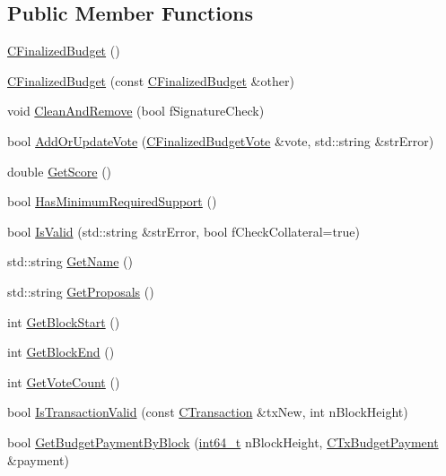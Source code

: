 \subsection*{Public Member Functions}
\begin{DoxyCompactItemize}
\item 
\hyperlink{class_c_finalized_budget_a70a5842e7be58407c5ff5daade0e6e45}{C\+Finalized\+Budget} ()
\item 
\hyperlink{class_c_finalized_budget_a701687a3f6f5dadaa8cf20b188306005}{C\+Finalized\+Budget} (const \hyperlink{class_c_finalized_budget}{C\+Finalized\+Budget} \&other)
\item 
void \hyperlink{class_c_finalized_budget_a11cbbc4f8f84e5ffb2b7257168da98be}{Clean\+And\+Remove} (bool f\+Signature\+Check)
\item 
bool \hyperlink{class_c_finalized_budget_a63fadb286f5d0f9f735bc33deba56b02}{Add\+Or\+Update\+Vote} (\hyperlink{class_c_finalized_budget_vote}{C\+Finalized\+Budget\+Vote} \&vote, std\+::string \&str\+Error)
\item 
double \hyperlink{class_c_finalized_budget_aadcaaf7b39cfe0400253db00c5fe0b03}{Get\+Score} ()
\item 
bool \hyperlink{class_c_finalized_budget_a96b19202f64cb941239a500e7895c048}{Has\+Minimum\+Required\+Support} ()
\item 
bool \hyperlink{class_c_finalized_budget_ae91a3b63f88979a2cf5252b91b9f339d}{Is\+Valid} (std\+::string \&str\+Error, bool f\+Check\+Collateral=true)
\item 
std\+::string \hyperlink{class_c_finalized_budget_adc46e6b0931fd6335d0788311886a1ba}{Get\+Name} ()
\item 
std\+::string \hyperlink{class_c_finalized_budget_a49cb2b919e0de352628d6157cfa1e1c8}{Get\+Proposals} ()
\item 
int \hyperlink{class_c_finalized_budget_adf320ff0b74a982c0aadc5d8a5e168db}{Get\+Block\+Start} ()
\item 
int \hyperlink{class_c_finalized_budget_a45b354d7c3ea65128130cf28e78f4bf4}{Get\+Block\+End} ()
\item 
int \hyperlink{class_c_finalized_budget_a6958b394133bceca95b49c25ce337b06}{Get\+Vote\+Count} ()
\item 
bool \hyperlink{class_c_finalized_budget_a32c98c7a24100e099093e7d33b9330f2}{Is\+Transaction\+Valid} (const \hyperlink{class_c_transaction}{C\+Transaction} \&tx\+New, int n\+Block\+Height)
\item 
bool \hyperlink{class_c_finalized_budget_aa5ec8ed8c03ce6bbc1c49edd942501c8}{Get\+Budget\+Payment\+By\+Block} (\hyperlink{stdint_8h_adec1df1b8b51cb32b77e5b86fff46471}{int64\+\_\+t} n\+Block\+Height, \hyperlink{class_c_tx_budget_payment}{C\+Tx\+Budget\+Payment} \&payment)

\end{DoxyCompactItemize}
